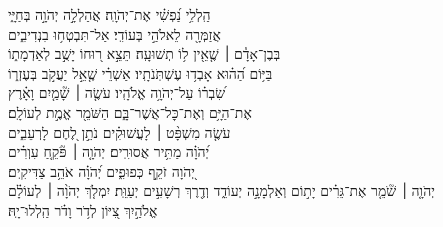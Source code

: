 \documentclass[twoside, openany, parskip=half, 11pt]{book}
\begin{document}
\negline

\ashrei


\begin{narrow}

\hfill \break
הַֽלְלִ֥י נַ֝פְשִׁ֗י אֶת־יְהֹוָֽה׃  \hfill
אֲהַלְלָ֣ה יְהֹוָ֣ה בְּחַיָּ֑י \\ אֲזַמְּרָ֖ה לֵאלֹהַ֣י בְּעוֹדִֽי׃ \hfill
אַל־תִּבְטְח֥וּ בִנְדִיבִ֑ים \\ בְּבֶן־אָדָ֓ם ׀ שֶׁ֤אֵ֖ין ל֥וֹ תְשׁוּעָֽה׃ \hfill
תֵּצֵ֣א ר֭וּחוֹ יָשֻׁ֣ב לְאַדְמָת֑וֹ \\ בַּיּ֥וֹם הַ֝ה֗וּא אָבְד֥וּ עֶשְׁתֹּֽנֹתָֽיו׃ \hfill
אַשְׁרֵ֗י שֶׁ֤אֵ֣ל יַעֲקֹ֣ב בְּעֶזְר֑וֹ\\ שִׂ֝בְר֗וֹ עַל־יְהֹוָ֥ה אֱלֹהָֽיו׃ \hfill
עֹשֶׂ֤ה ׀ שָׁ֘מַ֤יִם וָאָ֗רֶץ \\ אֶת־הַיָּ֥ם וְאֶת־כׇּל־אֲשֶׁר־בָּ֑ם  \hfill הַשֹּׁמֵ֖ר אֱמֶ֣ת לְעוֹלָֽם׃\\
עֹשֶׂ֤ה מִשְׁפָּ֨ט ׀ לָעֲשׁוּקִ֗ים \hfill נֹתֵ֣ן לֶ֭חֶם לָרְעֵבִ֑ים \\ יְ֝הֹוָ֗ה מַתִּ֥יר אֲסוּרִֽים׃ \hfill
יְהֹוָ֤ה ׀ פֹּ֘קֵ֤חַ עִוְרִ֗ים \\ יְ֭הֹוָה זֹקֵ֣ף כְּפוּפִ֑ים  \hfill יְ֝הֹוָ֗ה אֹהֵ֥ב צַדִּיקִֽים׃\\
יְהֹוָ֤ה ׀ שֹׁ֘מֵ֤ר אֶת־גֵּרִ֗ים יָת֣וֹם וְאַלְמָנָ֣ה יְעוֹדֵ֑ד וְדֶ֖רֶךְ רְשָׁעִ֣ים יְעַוֵּֽת׃ \hfill
יִמְלֹ֤ךְ יְהֹוָ֨ה ׀ לְעוֹלָ֗ם\\ אֱלֹהַ֣יִךְ צִ֭יּוֹן לְדֹ֥ר וָדֹ֗ר \hfill הַֽלְלוּ־יָֽהּ׃ 




\end{narrow}
\end{document}
